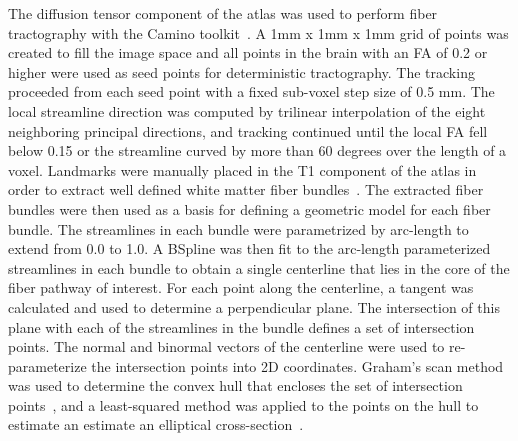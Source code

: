 The diffusion tensor component of the atlas was used to perform fiber tractography with the Camino toolkit~\cite{Cook2006}. A 1mm x 1mm x 1mm grid of points was created to fill the image space and all points in the brain with an FA of 0.2 or higher were used as seed points for deterministic tractography. The tracking proceeded from each seed point with a fixed sub-voxel step size of 0.5 mm. The local streamline direction was computed by trilinear interpolation of the eight neighboring principal directions, and tracking continued until the local FA fell below 0.15 or the streamline curved by more than 60 degrees over the length of a voxel. Landmarks were manually placed in the T1 component of the atlas in order to extract well defined white matter fiber bundles~\cite{Mori2002a,Wakana2004,Wakana2007}. The extracted fiber bundles were then used as a basis for defining a geometric model for each fiber bundle. The streamlines in each bundle were parametrized by arc-length to extend from 0.0 to 1.0. A BSpline was then fit to the arc-length parameterized streamlines in each bundle to obtain a single centerline that lies in the core of the fiber pathway of interest. For each point along the centerline, a tangent was calculated and used to determine a perpendicular plane. The intersection of this plane with each of the streamlines in the bundle defines a set of intersection points.  The normal and binormal vectors of the centerline were used to re-parameterize the intersection points into 2D coordinates. Graham's scan method was used to determine the convex hull that encloses the set of intersection points~\cite{Graham1972}, and a least-squared method was applied to the points on the hull to estimate an estimate an elliptical cross-section~\cite{Fitzgibbon1999}.

